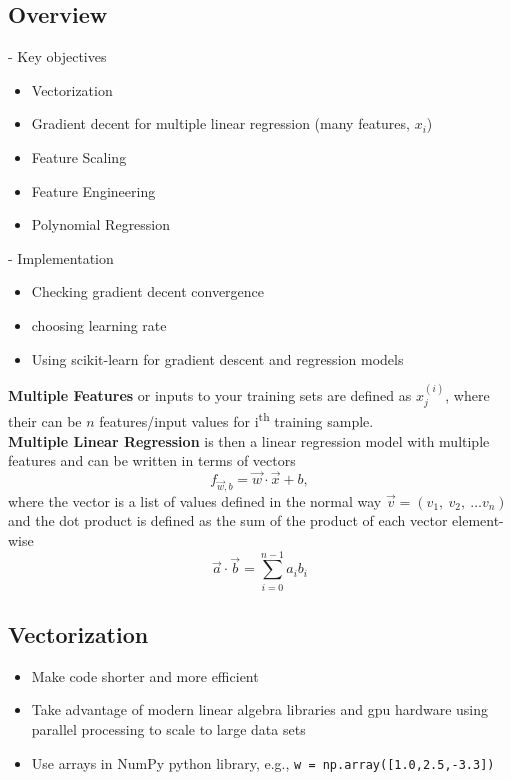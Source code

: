 \documentclass[11pt,letterpaper]{article}
\begin{document}
\subsection{Overview}
- Key objectives  
\begin{itemize}
	\item Vectorization
	\item Gradient decent for multiple linear regression (many features,  $x_i$) 
	\item Feature Scaling
	\item Feature Engineering
	\item Polynomial Regression
	
\end{itemize}

\noindent 
- Implementation
\begin{itemize}
	\item Checking gradient decent convergence
	\item choosing learning rate
	\item Using scikit-learn for gradient descent and regression models
\end{itemize}

\begin{notebox}
	\textbf{Multiple Features} or inputs to your training sets are defined as $x_j^{(i)}$, where their can be $n$ features/input values for i\textsuperscript{th} training sample. 
	\\ 
	\textbf{Multiple Linear Regression} is then a linear regression model with multiple features and can be written in terms of vectors
	\begin{equation}\label{eq:multiple_linear_regression}
		f_{\vec{w},b} = \vec{w}\cdot \vec{x} + b,
	\end{equation}
	where the vector is a list of values defined in the normal way $\vec{v}=(v_1,\ v_2,\  \dots v_n)$ and the dot product is defined as the sum of the product of each vector element-wise
	\begin{equation}\label{eq:dot_product}
		\vec{a}\cdot \vec{b} = \sum\limits_{i=0}^{n-1} a_i b_i
	\end{equation}
\end{notebox}

\subsection{Vectorization}

\begin{itemize}
	\item Make code shorter and more efficient
	\item Take advantage of modern linear algebra libraries and gpu hardware using parallel processing to scale to large data sets
	\item Use arrays in NumPy python library, e.g.,  \verb|w = np.array([1.0,2.5,-3.3])|
\end{itemize}
\end{document}

